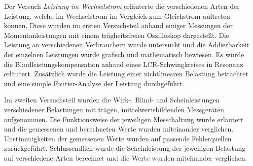 
Der Versuch \textit{Leistung im Wechselstrom} erläuterte die verschiedenen Arten der Leistung, welche im Wechselstrom im Vergleich zum Gleichstrom auftreten können. Diese wurden im ersten Versuchsteil anhand einiger Messungen der Momentanleistungen mit einem trägheitsfreien Oszilloskop dargestellt. Die Leistung an verschiedenen Verbrauchern wurde untersucht und die Addierbarkeit der einzelnen Leistungen wurde grafisch und mathematisch bewiesen. Es wurde die Blindleistungskompensation anhand eines LCR-Schwingkreises in Resonanz erläutert. Zusätzlich wurde die Leistung einer nichtlinearen Belastung betrachtet und eine simple Fourier-Analyse der Leistung durchgeführt.

Im zweiten Versuchsteil wurden die Wirk-, Blind- und Scheinleistungen verschiedener Belastungen mit trägen, mittelwertsbildenden Messgeräten aufgenommen. Die Funktionsweise der jeweiligen Messchaltung wurde erläutert und die gemessenen und berechneten Werte wurden miteinander verglichen. Unstimmigkeiten der gemessenen Werte wurden auf passende Fehlerquellen zurückgeführt. Schlussendlich wurde die Scheinleistung der jeweiligen Belastung auf verschiedene Arten berechnet und die Werte wurden miteinander verglichen.